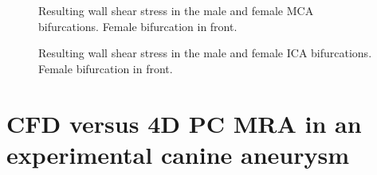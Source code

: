 \begin{figure}
  \begin{center}
    \caption{Resulting wall shear stress in the male and female MCA
      bifurcations. Female bifurcation in front. }
    \label{fig:mca_wss_res}
  \end{center}
\end{figure}

\begin{figure}
  \begin{center}
    \caption{Resulting wall shear stress in the male and female ICA
      bifurcations. Female bifurcation in front.}
    \label{fig:ica_wss_res}
  \end{center}
\end{figure}

\section{CFD versus 4D PC MRA in an experimental canine aneurysm} \label{dog_study}

